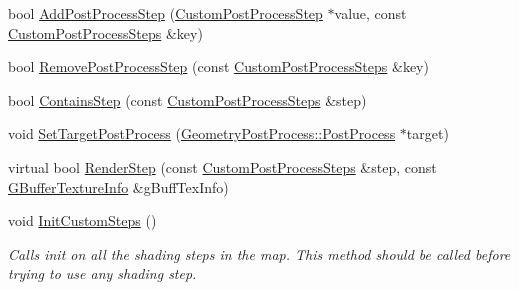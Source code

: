 \begin{DoxyCompactItemize}
\item 
bool \mbox{\hyperlink{class_geometry_engine_1_1_custom_shading_1_1_custom_post_process_step_interface_a2a4a9f74d40d548d4f10057e642bd607}{Add\+Post\+Process\+Step}} (\mbox{\hyperlink{class_geometry_engine_1_1_custom_shading_1_1_custom_post_process_step}{Custom\+Post\+Process\+Step}} $\ast$value, const \mbox{\hyperlink{namespace_geometry_engine_1_1_custom_shading_a09e44ca81de5fe08c6d50271d680c4b1}{Custom\+Post\+Process\+Steps}} \&key)
\item 
bool \mbox{\hyperlink{class_geometry_engine_1_1_custom_shading_1_1_custom_post_process_step_interface_a206813ece767bcbf0758dda0cd2446fd}{Remove\+Post\+Process\+Step}} (const \mbox{\hyperlink{namespace_geometry_engine_1_1_custom_shading_a09e44ca81de5fe08c6d50271d680c4b1}{Custom\+Post\+Process\+Steps}} \&key)
\item 
bool \mbox{\hyperlink{class_geometry_engine_1_1_custom_shading_1_1_custom_post_process_step_interface_ac2500c050d94e4d77bb785e8b9322af8}{Contains\+Step}} (const \mbox{\hyperlink{namespace_geometry_engine_1_1_custom_shading_a09e44ca81de5fe08c6d50271d680c4b1}{Custom\+Post\+Process\+Steps}} \&step)
\item 
void \mbox{\hyperlink{class_geometry_engine_1_1_custom_shading_1_1_custom_post_process_step_interface_a122afe43200a8b32100b8dea42010418}{Set\+Target\+Post\+Process}} (\mbox{\hyperlink{class_geometry_engine_1_1_geometry_post_process_1_1_post_process}{Geometry\+Post\+Process\+::\+Post\+Process}} $\ast$target)
\item 
virtual bool \mbox{\hyperlink{class_geometry_engine_1_1_custom_shading_1_1_custom_post_process_step_interface_a953149fd44b01423b1adab83cd16064a}{Render\+Step}} (const \mbox{\hyperlink{namespace_geometry_engine_1_1_custom_shading_a09e44ca81de5fe08c6d50271d680c4b1}{Custom\+Post\+Process\+Steps}} \&step, const \mbox{\hyperlink{class_geometry_engine_1_1_g_buffer_texture_info}{G\+Buffer\+Texture\+Info}} \&g\+Buff\+Tex\+Info)
\item 
\mbox{\label{class_geometry_engine_1_1_custom_shading_1_1_custom_post_process_step_interface_a0f8218623247433b8836ca3de6c6188f}} 
void \mbox{\hyperlink{class_geometry_engine_1_1_custom_shading_1_1_custom_post_process_step_interface_a0f8218623247433b8836ca3de6c6188f}{Init\+Custom\+Steps}} ()
\begin{DoxyCompactList}\small\item\em Calls init on all the shading steps in the map. This method should be called before trying to use any shading step. \end{DoxyCompactList}\item 

\end{DoxyCompactItemize}
